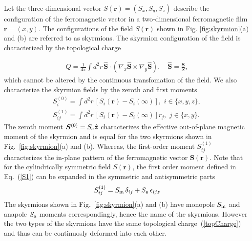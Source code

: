 \documentclass[twocolumn,showpacs,floatfix,nofootinbib,longbibliography]{revtex4-1}
\begin{document}
Let the three-dimensional vector $S(\bm r) = (S_x,S_y,S_z)$ describe the configuration of the ferromagnetic vector in a two-dimensional ferromagnetic film $\bm r = (x,y)$. The configurations of the field $S(\bm r)$ shown in Fig. \ref{fig:skyrmion}(a) and (b) are referred to as skyrmions. The skyrmion configuration of the field is characterized by the topological charge 

\begin{align}
	Q = \frac{1}{4\pi} \int d^2r \, \hat {\bm S}\cdot (\nabla_x\hat {\bm S}\times\nabla_y\hat {\bm S}), \quad \hat {\bm S}= \frac{\bm S}{S}, 
	\label{topCharge}
\end{align}
which cannot be altered by the continuous transfomation of the field.  We also characterize the skyrmion fields by the zeroth and first moments
\begin{align}
	S^{(0)}_i = \int  d^2r \, \left[S_i(\bm r)-S_i(\infty)\right],\,\, i\in \{x,y,z\}, \label{S0} \\
	S^{(1)}_{ij} = \int  d^2r \, \left[S_i(\bm r)-S_i(\infty)\right] r_j,\,\, j\in \{x,y\}. \label{S1}
\end{align}
The zeroth moment $\bm S^{(0)} = S_{\rm e} \hat{\bm z}$ characterizes the effective out-of-plane magnetic moment of the skyrmion and is equal for the two skyrmions shown in Fig.~{\ref{fig:skyrmion}}(a) and (b). Whereas, the first-order moment $S^{(1)}_{ij}$ characterizes the in-plane pattern of the ferromagnetic vector $\bm S(\bm r)$. Note that for the cylindrically symmetric field $S(\bm r)$, the first order moment defined in Eq.~(\ref{S1}) can be expanded in the symmetric and antisymmetric parts 
\begin{equation}
	S^{(1)}_{ij}=S_{\rm m}\,\delta_{ij} + S_{\rm a}\,\epsilon_{ijz}
\end{equation}	
The skyrmions shown in Fig.~\ref{fig:skyrmion}(a) and (b) have monopole $S_{\rm m}$ and anapole $S_{\rm a}$ moments correspondingly, hence the name of the skyrmions. However the two types of the skyrmions have the same topological charge~(\ref{topCharge}) and thus can be continuosly deformed into each other. 

\end{document}
